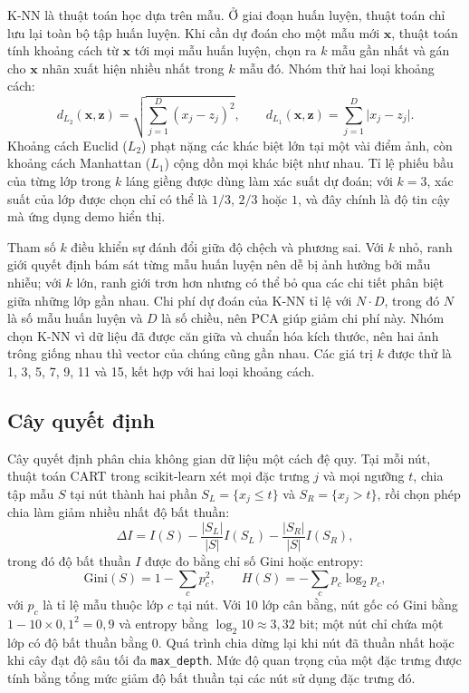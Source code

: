 \documentclass[a4paper,oneside]{report}
\begin{document}
K-NN \cite{esl} là thuật toán học dựa trên mẫu. Ở giai đoạn huấn luyện, thuật toán chỉ lưu lại toàn bộ tập huấn
luyện. Khi cần dự đoán cho một mẫu mới $\mathbf{x}$, thuật toán tính khoảng cách từ $\mathbf{x}$ tới mọi mẫu huấn
luyện, chọn ra $k$ mẫu gần nhất và gán cho $\mathbf{x}$ nhãn xuất hiện nhiều nhất trong $k$ mẫu đó. Nhóm thử hai
loại khoảng cách:
\begin{equation}
d_{L_2}(\mathbf{x}, \mathbf{z}) = \sqrt{\sum_{j=1}^{D} (x_j - z_j)^2}, \qquad
d_{L_1}(\mathbf{x}, \mathbf{z}) = \sum_{j=1}^{D} \lvert x_j - z_j \rvert.
\end{equation}
Khoảng cách Euclid ($L_2$) phạt nặng các khác biệt lớn tại một vài điểm ảnh, còn khoảng cách Manhattan ($L_1$) cộng
dồn mọi khác biệt như nhau. Tỉ lệ phiếu bầu của từng lớp trong $k$ láng giềng được dùng làm xác suất dự đoán; với
$k = 3$, xác suất của lớp được chọn chỉ có thể là $1/3$, $2/3$ hoặc $1$, và đây chính là độ tin cậy mà ứng dụng
demo hiển thị.

Tham số $k$ điều khiển sự đánh đổi giữa độ chệch và phương sai. Với $k$ nhỏ, ranh giới quyết định bám sát từng mẫu
huấn luyện nên dễ bị ảnh hưởng bởi mẫu nhiễu; với $k$ lớn, ranh giới trơn hơn nhưng có thể bỏ qua các chi tiết phân
biệt giữa những lớp gần nhau. Chi phí dự đoán của K-NN tỉ lệ với $N \cdot D$, trong đó $N$ là số mẫu huấn luyện và
$D$ là số chiều, nên PCA giúp giảm chi phí này. Nhóm chọn K-NN vì dữ liệu đã được căn giữa và chuẩn hóa kích thước,
nên hai ảnh trông giống nhau thì vector của chúng cũng gần nhau. Các giá trị $k$ được thử là 1, 3, 5, 7, 9, 11 và
15, kết hợp với hai loại khoảng cách.

\subsection{Cây quyết định}

Cây quyết định phân chia không gian dữ liệu một cách đệ quy. Tại mỗi nút, thuật toán CART trong scikit-learn xét
mọi đặc trưng $j$ và mọi ngưỡng $t$, chia tập mẫu $S$ tại nút thành hai phần $S_L = \{x_j \le t\}$ và
$S_R = \{x_j > t\}$, rồi chọn phép chia làm giảm nhiều nhất độ bất thuần:
\begin{equation}
\Delta I = I(S) - \frac{|S_L|}{|S|} I(S_L) - \frac{|S_R|}{|S|} I(S_R),
\end{equation}
trong đó độ bất thuần $I$ được đo bằng chỉ số Gini hoặc entropy:
\begin{equation}
\text{Gini}(S) = 1 - \sum_{c} p_c^2, \qquad H(S) = -\sum_{c} p_c \log_2 p_c,
\end{equation}
với $p_c$ là tỉ lệ mẫu thuộc lớp $c$ tại nút. Với 10 lớp cân bằng, nút gốc có Gini bằng $1 - 10 \times 0{,}1^2 =
0{,}9$ và entropy bằng $\log_2 10 \approx 3{,}32$ bit; một nút chỉ chứa một lớp có độ bất thuần bằng 0. Quá trình
chia dừng lại khi nút đã thuần nhất hoặc khi cây đạt độ sâu tối đa \texttt{max\_depth}. Mức độ quan trọng của một
đặc trưng được tính bằng tổng mức giảm độ bất thuần tại các nút sử dụng đặc trưng đó.
\end{document}
